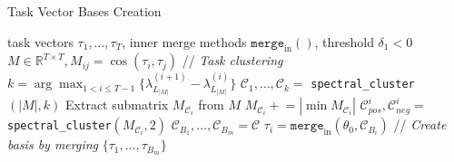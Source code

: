 \begin{algorithm}[tb]
   \caption{Task Vector Bases Creation}
   \label{alg:task_vector_basis}
\begin{algorithmic}[1]

    task vectors $\tau_1, \dots, \tau_T$, inner merge methods $\texttt{merge}_\text{in}()$, threshold $\delta_1 < 0$
   \STATE $M \in \mathbb{R}^{T\times T}, M_{ij} = \cos(\tau_i,\tau_j)$ // \textit{Task clustering}
   \STATE $k = \arg\max_{1 < i \leq {T-1}} \{\lambda^{(i+1)}_{L_{|M|}} - \lambda^{(i)}_{L_{|M|}}\}$ 
   \STATE $\mathcal{C}_1, \dots, \mathcal{C}_k = $ \texttt{spectral\_cluster}$(|M|, k)$
   \STATE \quad Extract submatrix $M_{\mathcal{C}_i}$ from $M$
      \STATE \quad \quad $M_{\mathcal{C}_i} \mathrel{+}= |\min{M_{\mathcal{C}_i}}|$ 
      \STATE \quad \quad $\mathcal{C}_{pos}^i, \mathcal{C}_{neg}^i = $ \texttt{spectral\_cluster}$(M_{\mathcal{C}_i}, 2)$
   \STATE $\mathcal{C}_{B_1}, \dots, \mathcal{C}_{B_m} = \mathcal{C}$  
   \STATE \quad $\tau_i = \texttt{merge}_\text{in}(\theta_0, \mathcal{C}_{B_i})$ // \textit{Create basis by merging}
    $\{\tau_1, \dots, \tau_{B_m}\}$
\end{algorithmic}
\end{algorithm}

\begin{table}[tb]
\caption{Bases Arithmetic. Here $i$ is a task id. There are several ways to interpret similarity search given bases and the target task.}
\label{tab:basis_arithmetic}
\centering
{}
\end{table}


